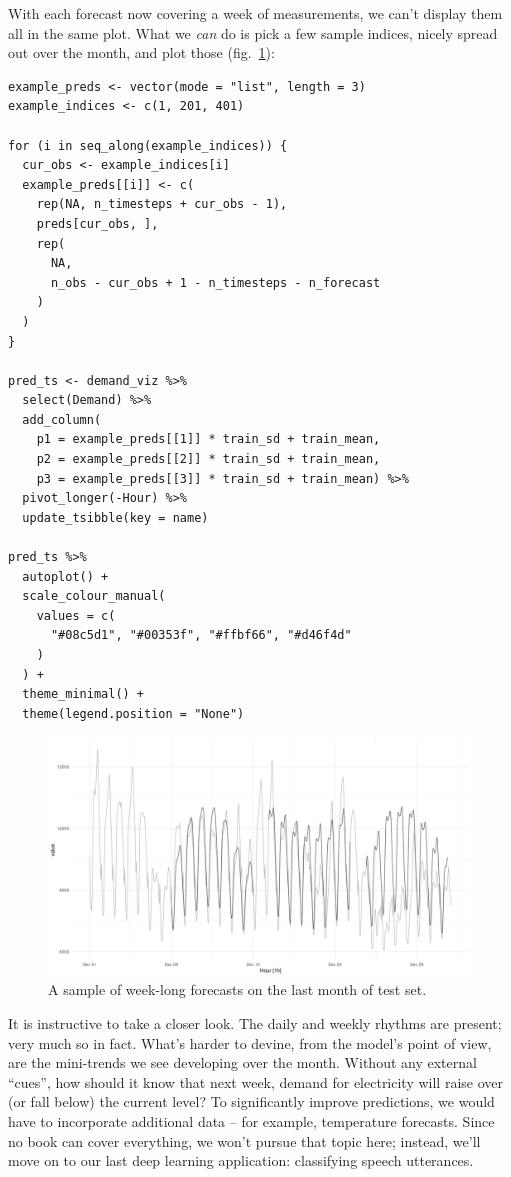 \documentclass[
  letterpaper,
]{krantz}
\begin{document}
With each forecast now covering a week of measurements, we can't display
them all in the same plot. What we \emph{can} do is pick a few sample
indices, nicely spread out over the month, and plot those
(fig.~\ref{fig-timeseries-vic-elec-preds-mlp}):

\begin{verbatim}
example_preds <- vector(mode = "list", length = 3)
example_indices <- c(1, 201, 401)

for (i in seq_along(example_indices)) {
  cur_obs <- example_indices[i]
  example_preds[[i]] <- c(
    rep(NA, n_timesteps + cur_obs - 1),
    preds[cur_obs, ],
    rep(
      NA,
      n_obs - cur_obs + 1 - n_timesteps - n_forecast
    )
  )
}

pred_ts <- demand_viz %>%
  select(Demand) %>%
  add_column(
    p1 = example_preds[[1]] * train_sd + train_mean,
    p2 = example_preds[[2]] * train_sd + train_mean,
    p3 = example_preds[[3]] * train_sd + train_mean) %>%
  pivot_longer(-Hour) %>%
  update_tsibble(key = name)

pred_ts %>%
  autoplot() +
  scale_colour_manual(
    values = c(
      "#08c5d1", "#00353f", "#ffbf66", "#d46f4d"
    )
  ) +
  theme_minimal() +
  theme(legend.position = "None")
\end{verbatim}

\begin{figure}[H]

{\centering \includegraphics{images/timeseries-vic-elec-preds-mlp.png}

}

\caption{\label{fig-timeseries-vic-elec-preds-mlp}A sample of week-long
forecasts on the last month of test set.}

\end{figure}

It is instructive to take a closer look. The daily and weekly rhythms
are present; very much so in fact. What's harder to devine, from the
model's point of view, are the mini-trends we see developing over the
month. Without any external ``cues'', how should it know that next week,
demand for electricity will raise over (or fall below) the current
level? To significantly improve predictions, we would have to
incorporate additional data -- for example, temperature forecasts. Since
no book can cover everything, we won't pursue that topic here; instead,
we'll move on to our last deep learning application: classifying speech
utterances.
\end{document}
